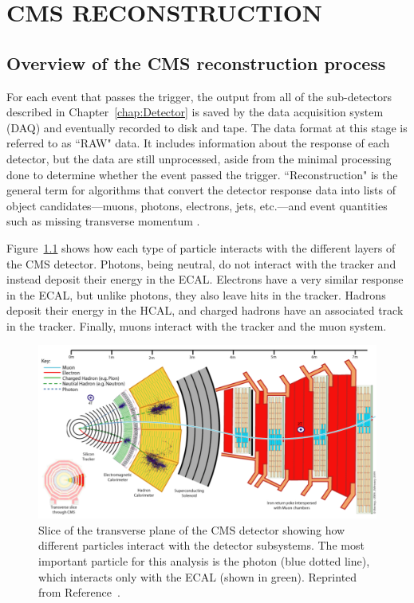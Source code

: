 \chapter{CMS RECONSTRUCTION}
\label{sec:EventReconstruction}

\section{Overview of the CMS reconstruction process}
\label{sec:recoOverview}

For each event that passes the trigger, the output from all of the sub-detectors described in Chapter~\ref{chap:Detector} is saved by the data acquisition system (DAQ) and eventually recorded to disk and tape. The data format at this stage is referred to as ``RAW" data. It includes information about the response of each detector, but the data are still unprocessed, aside from the minimal processing done to determine whether the event passed the trigger. ``Reconstruction" is the general term for algorithms that convert the detector response data into lists of object candidates---muons, photons, electrons, jets, etc.---and event quantities such as missing transverse momentum \ptmiss. 

Figure~\ref{fig:cmsSlice} shows how each type of particle interacts with the different layers of the CMS detector. Photons, being neutral, do not interact with the tracker and instead deposit their energy in the ECAL. Electrons have a very similar response in the ECAL, but unlike photons, they also leave hits in the tracker. Hadrons deposit their energy in the HCAL, and charged hadrons have an associated track in the tracker. Finally, muons interact with the tracker and the muon system. 

 \begin{figure}[h!]
	\centering
	\includegraphics[width=\linewidth]{Figures/EventReconstruction/cms_slice.pdf}
       \caption[Slice of the transverse plane of the CMS detector showing how different particles interact with the detector subsystems.]
       {Slice of the transverse plane of the CMS detector showing how different particles interact with the detector subsystems. The most important particle for this analysis is the photon (blue dotted line), which interacts only with the ECAL (shown in green).
       Reprinted from Reference~\cite{CDS}.}
       \label{fig:cmsSlice}
\end{figure}

